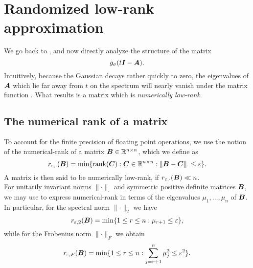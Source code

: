 \chapter{Randomized low-rank approximation}
\label{chp:3-nystrom}

We go back to , and now
directly analyze the structure of the matrix
\begin{equation}
    g_{\sigma}(t\boldsymbol{I} - \boldsymbol{A}).
    \label{equ:3-nystrom-matrix-function}
\end{equation}
Intuitively, because the
Gaussian  
decays rather quickly to zero, the eigenvalues of $\boldsymbol{A}$ which lie far away
from $t$ on the spectrum will nearly vanish under the matrix function .
What results is a matrix which is \emph{numerically low-rank}.


\section{The numerical rank of a matrix}
\label{sec:3-nystrom-numerical-rank}


To account for the finite precision of floating point operations, we use the
notion of the \gls{numerical-rank} \cite[Definition~1.1]{noga2013rank}
of a matrix $\boldsymbol{B} \in \mathbb{R}^{n \times n}$, which we define as
\begin{equation}
    r_{\varepsilon, \cdot}(\boldsymbol{B}) = \min \{\operatorname{rank}(\boldsymbol{C}): \boldsymbol{C} \in \mathbb{R}^{n \times n}: \lVert \boldsymbol{B} - \boldsymbol{C} \rVert _{\cdot} \leq \varepsilon \}.
    \label{equ:3-nystrom-def-numerical-rank}
\end{equation}
A matrix is then said to be numerically low-rank, if $r_{\varepsilon, \cdot}(\boldsymbol{B}) \ll n$.\\ 

For unitarily invariant norms $\lVert \cdot \rVert _{\cdot}$ and 
symmetric positive definite matrices $\boldsymbol{B}$, we may use
\cite[Theorem~5]{mirsky1960truncation} to express \gls{numerical-rank} in terms
of the eigenvalues $\mu_1, \dots, \mu_n$ of $\boldsymbol{B}$.
In particular, for the spectral norm $\lVert \cdot \rVert _2$ we have
\begin{equation}
    r_{\varepsilon, 2}(\boldsymbol{B}) = \min \{1 \leq r \leq n: \mu_{r+1} \leq \varepsilon \},
    \label{equ:3-nystrom-numerical-rank-spectral-norm}
\end{equation}
while for the Frobenius norm $\lVert \cdot \rVert _F$ we obtain
\begin{equation}
    r_{\varepsilon, F}(\boldsymbol{B}) = \min \{1 \leq r \leq n: \sum_{j=r+1}^n \mu_{j}^2 \leq \varepsilon^2 \}.
    \label{equ:3-nystrom-numerical-rank-frobenius-norm}
\end{equation}\\

